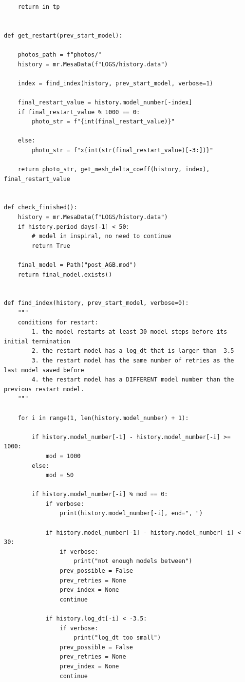 \documentclass[a4paper,10pt]{article}
\begin{document}
\begin{full}
\begin{verbatim}
    return in_tp


def get_restart(prev_start_model):

    photos_path = f"photos/"
    history = mr.MesaData(f"LOGS/history.data")

    index = find_index(history, prev_start_model, verbose=1)

    final_restart_value = history.model_number[-index]
    if final_restart_value % 1000 == 0:
        photo_str = f"{int(final_restart_value)}"

    else:
        photo_str = f"x{int(str(final_restart_value)[-3:])}"

    return photo_str, get_mesh_delta_coeff(history, index), final_restart_value


def check_finished():
    history = mr.MesaData(f"LOGS/history.data")
    if history.period_days[-1] < 50:
        # model in inspiral, no need to continue
        return True

    final_model = Path("post_AGB.mod")
    return final_model.exists()


def find_index(history, prev_start_model, verbose=0):
    """
    conditions for restart:
        1. the model restarts at least 30 model steps before its initial termination
        2. the restart model has a log_dt that is larger than -3.5
        3. the restart model has the same number of retries as the last model saved before
        4. the restart model has a DIFFERENT model number than the previous restart model.
    """

    for i in range(1, len(history.model_number) + 1):

        if history.model_number[-1] - history.model_number[-i] >= 1000:
            mod = 1000
        else:
            mod = 50

        if history.model_number[-i] % mod == 0:
            if verbose:
                print(history.model_number[-i], end=", ")

            if history.model_number[-1] - history.model_number[-i] < 30:
                if verbose:
                    print("not enough models between")
                prev_possible = False
                prev_retries = None
                prev_index = None
                continue

            if history.log_dt[-i] < -3.5:
                if verbose:
                    print("log_dt too small")
                prev_possible = False
                prev_retries = None
                prev_index = None
                continue


\end{verbatim}
\end{full}
\end{document}
